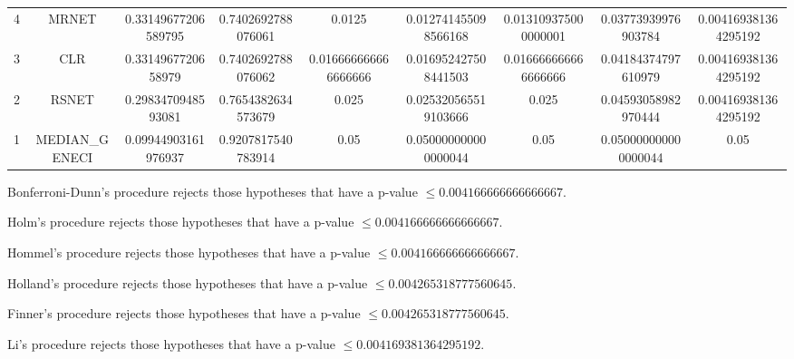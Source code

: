 \documentclass[a4paper,10pt]{article}
\begin{document}
\begin{landscape}
\begin{table}[!htp]
\begin{tabular}{ccccccccc}
4&MRNET&0.33149677206589795&0.7402692788076061&0.0125&0.012741455098566168&0.013109375000000001&0.03773939976903784&0.004169381364295192\\
3&CLR&0.3314967720658979&0.7402692788076062&0.016666666666666666&0.016952427508441503&0.016666666666666666&0.04184374797610979&0.004169381364295192\\
2&RSNET&0.2983470948593081&0.7654382634573679&0.025&0.025320565519103666&0.025&0.04593058982970444&0.004169381364295192\\
1&MEDIAN_GENECI&0.09944903161976937&0.9207817540783914&0.05&0.050000000000000044&0.05&0.050000000000000044&0.05\\
\hline
\end{tabular}
\end{table}
Bonferroni-Dunn's procedure rejects those hypotheses that have a p-value $\le0.004166666666666667$.


Holm's procedure rejects those hypotheses that have a p-value $\le0.004166666666666667$.


Hommel's procedure rejects those hypotheses that have a p-value $\le0.004166666666666667$.


Holland's procedure rejects those hypotheses that have a p-value $\le0.004265318777560645$.


Finner's procedure rejects those hypotheses that have a p-value $\le0.004265318777560645$.


Li's procedure rejects those hypotheses that have a p-value $\le0.004169381364295192$.



\newpage


\end{landscape}
\end{document}

